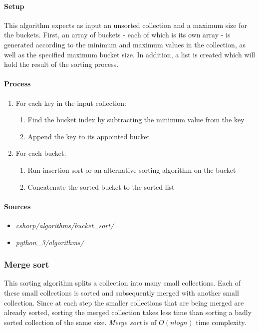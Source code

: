 \documentclass{article}
\begin{document}
\paragraph{Setup}
This algorithm expects as input an unsorted collection and a maximum size for the buckets. First, an array of
buckets - each of which is its own array - is generated according to the minimum and maximum values in the
collection, as well as the specified maximum bucket size. In addition, a list is created which will hold the
result of the sorting process.

\paragraph{Process}
\begin{enumerate}
\item{For each key in the input collection:}
  \begin{enumerate}
  \item{Find the bucket index by subtracting the minimum value from the key}
  \item{Append the key to its appointed bucket}
  \end{enumerate}
\item{For each bucket:}
  \begin{enumerate}
  \item{Run insertion sort or an alternative sorting algorithm on the bucket}
  \item{Concatenate the sorted bucket to the sorted list}
  \end{enumerate}
\end{enumerate}

\begin{samepage}
  \paragraph{Sources}
  \begin{itemize}
  \item{{\em csharp/algorithms/bucket\_sort/}}
  \item{{\em python\_3/algorithms/}}
  \end{itemize}
\end{samepage}


\subsubsection{Merge sort}
This sorting algorithm splits a collection into many small collections. Each of these small collections is sorted and
subsequently merged with another small collection. Since at each step the smaller collections that are being merged
are already sorted, sorting the merged collection takes less time than sorting a badly sorted collection of the same
size. {\em Merge sort} is of \(O(n log n)\) time complexity.
\end{document}

